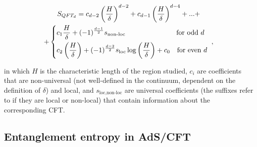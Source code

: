 \documentclass[twocolumn]{revtex4}
\providecommand{\eq}[2]{
    \begin{equation}
        #2
    \label{eq:#1}
    \end{equation}
}
\providecommand{\eqgat}[2]{
    \begin{gather}
        #2
    \label{eq:#1}
    \end{gather}
}
\begin{document}
\eqgat{EE}{
    S_{QFT_d} = c_{d-2} \left( \frac{H}{\delta} \right) ^{d-2} + c_{d-1} \left( \frac{H}{\delta} \right) ^{d-4} + ... + \nonumber \\
    + \begin{dcases}
        c_1 \frac{H}{\delta} + (-1)^{\frac{d-1}{2}} s_{\text{non-loc}}
        \qquad \qquad \qquad \quad \ \text{for odd } d \\
        c_2 \left ( \frac{H}{\delta} \right ) + (-1)^{\frac{d-2}{2}} s_{\text{loc}} \log \left ( \frac{H}{\delta} \right ) + c_0
        \quad \text{for even } d
    \end{dcases} \ ,
}
\cite{nishioka_entanglement_2018} in which $H$ is the characteristic length of the region studied, $c_i$ are coefficients that are non-universal (not well-defined in the continuum, dependent on the definition of $\delta$) and local, and $s_{\text{loc},\text{non-loc}}$ are universal coefficients (the suffixes refer to if they are local or non-local) that contain information about the corresponding CFT.


\subsection{Entanglement entropy in AdS/CFT} \label{ss:EE_AdS/CFT}
\end{document}

